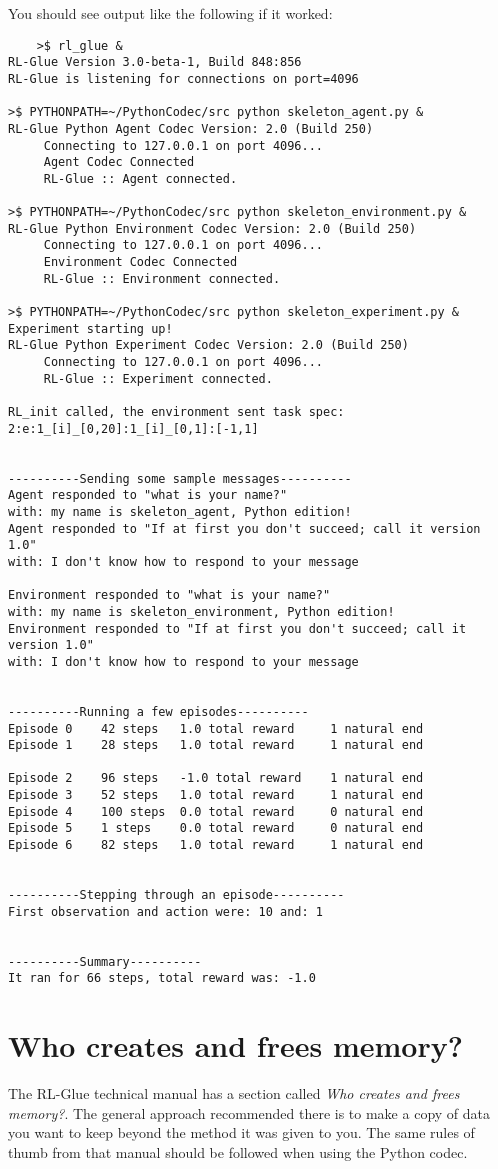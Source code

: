 \documentclass[11pt]{article}
\begin{document}
You should see output like the following if it worked:
\begin{verbatim}
	>$ rl_glue &
RL-Glue Version 3.0-beta-1, Build 848:856
RL-Glue is listening for connections on port=4096

>$ PYTHONPATH=~/PythonCodec/src python skeleton_agent.py &
RL-Glue Python Agent Codec Version: 2.0 (Build 250)
     Connecting to 127.0.0.1 on port 4096...
     Agent Codec Connected
     RL-Glue :: Agent connected.

>$ PYTHONPATH=~/PythonCodec/src python skeleton_environment.py &
RL-Glue Python Environment Codec Version: 2.0 (Build 250)
     Connecting to 127.0.0.1 on port 4096...
     Environment Codec Connected
     RL-Glue :: Environment connected.

>$ PYTHONPATH=~/PythonCodec/src python skeleton_experiment.py &
Experiment starting up!
RL-Glue Python Experiment Codec Version: 2.0 (Build 250)
     Connecting to 127.0.0.1 on port 4096...
     RL-Glue :: Experiment connected.

RL_init called, the environment sent task spec: 2:e:1_[i]_[0,20]:1_[i]_[0,1]:[-1,1]


----------Sending some sample messages----------
Agent responded to "what is your name?" 
with: my name is skeleton_agent, Python edition!
Agent responded to "If at first you don't succeed; call it version 1.0" 
with: I don't know how to respond to your message

Environment responded to "what is your name?" 
with: my name is skeleton_environment, Python edition!
Environment responded to "If at first you don't succeed; call it version 1.0" 
with: I don't know how to respond to your message


----------Running a few episodes----------
Episode 0	 42 steps 	1.0 total reward	 1 natural end
Episode 1	 28 steps 	1.0 total reward	 1 natural end

Episode 2	 96 steps 	-1.0 total reward	 1 natural end
Episode 3	 52 steps 	1.0 total reward	 1 natural end
Episode 4	 100 steps 	0.0 total reward	 0 natural end
Episode 5	 1 steps 	0.0 total reward	 0 natural end
Episode 6	 82 steps 	1.0 total reward	 1 natural end


----------Stepping through an episode----------
First observation and action were: 10 and: 1


----------Summary----------
It ran for 66 steps, total reward was: -1.0
\end{verbatim}


\section{Who creates and frees memory?}
The RL-Glue technical manual has a section called \textit{Who creates and frees memory?}.  The general approach recommended there is to make a copy of data
you want to keep beyond the method it was given to you.  The same rules of thumb from that manual should be followed when using the Python codec.
\end{document}
